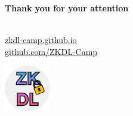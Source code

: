 \documentclass{zkdl-presentation-template}
\begin{document}
    \begin{frame}
        \centering
        \LARGE
        \textbf{Thank you for your attention} \\

        \vspace{0.2cm} \Huge {} \large \\

        \vspace{1cm}

        \href{https://zkdl-camp.github.io/}{\hspace{.325em}zkdl-camp.github.io} \\

        \href{https://github.com/ZKDL-Camp}{\hspace{.325em}github.com/ZKDL-Camp}

        \begin{center}
            \includegraphics[width=0.15\textwidth]{images/logo.png}
        \end{center}
    \end{frame}
\end{document}

